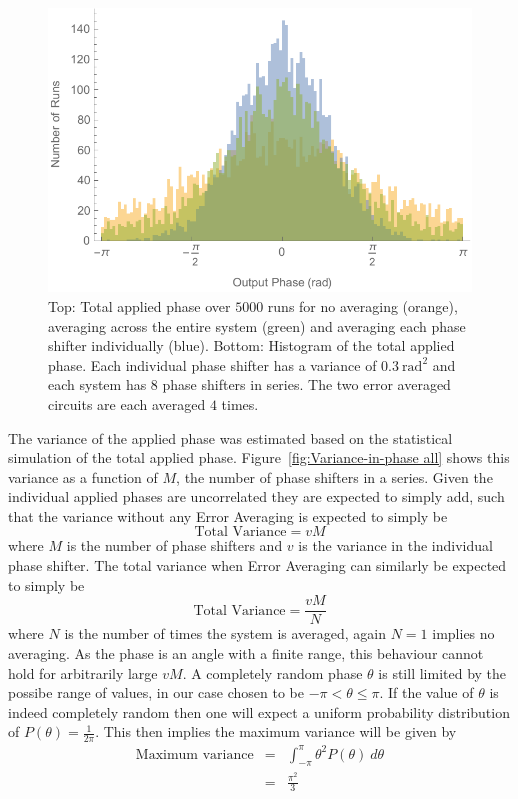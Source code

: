 \documentclass[aps,pra,twocolumn,superscriptaddress,numerical,floatfix]{revtex4-1}
\begin{document}
%
\begin{figure}
\centerline{\includegraphics[width=\columnwidth]{totPhase2.pdf}}
\caption{Top: Total applied phase over $5000$ runs for no averaging (orange), averaging across the entire system (green) and averaging each phase shifter individually (blue). Bottom: Histogram of the total applied phase. Each individual phase shifter has a variance of $0.3\ \textrm{rad}^{2}$ and each system has $8$ phase shifters in series. The two error averaged circuits are each averaged $4$ times. \label{fig:Total-applied-phase2}}
\end{figure}

The variance of the applied phase was estimated based on the statistical simulation of the total applied phase. Figure~\ref{fig:Variance-in-phase all} shows this variance as a function of $M$, the number of phase shifters in a series. Given the individual applied phases are uncorrelated they are expected to simply add, such that the variance without any Error Averaging is expected to simply be
\begin{equation}
\textrm{Total Variance}=vM\label{eq:Tot Var no correction}
\end{equation}
where $M$ is the number of phase shifters and $v$ is the variance in the individual phase shifter. The total variance when Error Averaging can similarly be expected to simply be
\begin{equation}
\textrm{Total Variance}=\frac{vM}{N}\label{eq:Tot Var w/ correction}
\end{equation}
where $N$ is the number of times the system is averaged, again $N=1$ implies no averaging. As the phase is an angle with a finite range, this behaviour cannot hold for arbitrarily large $vM$. A completely random phase $\theta$ is still limited by the possibe range of values, in our case chosen to be $-\pi<\theta\le\pi$. If the value of $\theta$ is indeed completely random then one will expect a uniform probability distribution of $P\left(\theta\right)=\frac{1}{2\pi}$. This then implies the maximum variance will be given by
\begin{eqnarray}
\textrm{Maximum variance} & = & \int_{-\pi}^{\pi}\theta^{2}P\left(\theta\right)\ d\theta\nonumber \\
& = & \frac{\pi^{2}}{3}\label{eq:Max Var}
\end{eqnarray}
\end{document}
